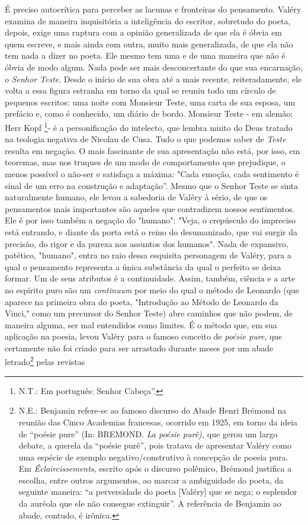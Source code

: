 É preciso autocrítica para perceber as lacunas e fronteiras do
pensamento. Valéry examina de maneira inquisitória a inteligência do
escritor, sobretudo do poeta, depois, exige uma ruptura com a opinião
generalizada de que ela é óbvia em quem escreve, e mais ainda com outra,
muito mais generalizada, de que ela não tem nada a dizer no poeta. Ele
mesmo tem uma e de uma maneira que não é óbvia de modo algum. Nada pode
ser mais desconcertante do que sua encarnação, o \emph{Senhor Teste}.
Desde o início de sua obra até a mais recente, reiteradamente, ele volta
a essa figura estranha em torno da qual se reuniu todo um círculo de
pequenos escritos: uma noite com Monsieur Teste, uma carta de sua
esposa, um prefácio e, como é conhecido, um diário de bordo. Monsieur
Teste - em alemão: Herr Kopf \footnote{N.T.: Em português: Senhor
  Cabeça''.}- é a personificação do intelecto, que lembra muito do Deus
tratado na teologia negativa de Nicolau de Cusa. Tudo o que podemos
saber de \emph{Teste} resulta em negação. O mais fascinante de sua
apresentação não está, por isso, em teoremas, mas nos truques de um modo
de comportamento que prejudique, o menos possível o não-ser e satisfaça
a máxima: "Cada emoção, cada sentimento é sinal de um erro na construção
e adaptação''. Mesmo que o Senhor Teste se sinta naturalmente humano,
ele levou a sabedoria de Valéry à sério, de que os pensamentos mais
importantes são aqueles que contradizem nossos sentimentos. Ele é por
isso também a negação do "humano": "Veja, o crepúsculo do impreciso está
entrando, e diante da porta está o reino do desumanizado, que vai surgir
da precisão, do rigor e da pureza nos assuntos dos humanos". Nada de
expansivo, patético, "humano", entra no raio dessa esquisita personagem
de Valéry, para a qual o pensamento representa a única substância da
qual o perfeito se deixa formar. Um de seus atributos é a continuidade.
Assim, também, ciência e a arte no espírito puro são um \emph{continuum}
por meio do qual o método de Leonardo (que aparece na primeira obra do
poeta, "Introdução ao Método de Leonardo da Vinci," como um precursor do
Senhor Teste) abre caminhos que não podem, de maneira alguma, ser mal
entendidos como limites. É o método que, em sua aplicação na poesia,
levou Valéry para o famoso conceito de \emph{poésie pure}, que
certamente não foi criado para ser arrastado durante meses por um abade
letrado\footnote{N.E.: Benjamin refere-se ao famoso discurso do Abade
  Henri Brémond na reunião das Cinco Academias francesas, ocorrido em
  1925, em torno da ideia de ``poésie pure'' (In: BREMOND. \emph{La
  poésie purê),} que gerou um largo debate, a querela da ``poésie
  purê'', pois tratava de apresentar Valéry como uma espécie de exemplo
  negativo/construtivo à concepção de poesia pura. Em
  \emph{Éclaircissements}, escrito após o discurso polêmico, Brémond
  justifica a escolha, entre outros argumentos, ao marcar a ambiguidade
  do poeta, da seguinte maneira: ``a perversidade do poeta {[}Valéry{]}
  que se nega; o esplendor da auréola que ele não consegue extinguir''.
  A referência de Benjamin ao abade, contudo, é irônica.} pelas revistas
